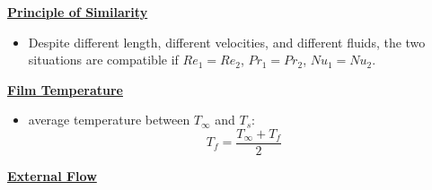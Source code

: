 \textbf{\underline{Principle of Similarity}}
\begin{itemize}
    \item Despite different length, different velocities, and different fluids, the two situations are compatible if $Re_1=Re_2$, $Pr_1 = Pr_2$, $Nu_1 = Nu_2$.
\end{itemize}

\textbf{\underline{Film Temperature}}
\begin{itemize}
    \item average temperature between $T_{\infty}$ and $T_{s}$: 
    \begin{equation*}
        T_f = \frac{T_{\infty}+T_{f}}{2}
    \end{equation*}
\end{itemize}

\textbf{\Large \underline{External Flow}}

